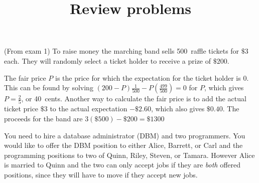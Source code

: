 \documentclass[answers,12pt]{exam}
\author{}\date{}
\title{Review problems}
\begin{document}
\maketitle
\pagestyle{empty}
\begin{questions}

\question (From exam 1)
To raise money the marching band sells 500~raffle tickets
for $\$3$ each. They will randomly select a ticket holder to receive
a prize of $\$200$.
\begin{solution}
The fair price $P$ is the price for which the expectation
for the ticket holder is $0$. This can be found by solving
$\left(200-P\right)\frac{1}{500}-P\left(\frac{499}{500}\right)=0$
for $P$, which gives $P=\frac{2}{5}$, or 40~cents.
Another way to calculate the fair price
is to add the actual ticket price $\$3$
to the actual expectation $-\$2.60$, which also gives $\$0.40$.
The proceeds for the band are $3\left(\$500\right)-\$200=\$1300$
\end{solution}

\question You need to hire a database administrator
(DBM) and two programmers. You would like to offer the DBM
position to either Alice, Barrett, or Carl and the programming
positions to two of Quinn, Riley, Steven, or Tamara.
However Alice is married to Quinn and the two can only accept
jobs if they are {\em both} offered positions, since they will have
to move if they accept new jobs.
\end{questions}
\end{document}
